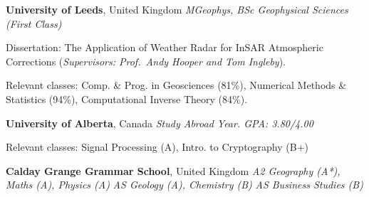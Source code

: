 %
\textbf{University of Leeds}, United Kingdom \newline
\emph{MGeophys, BSc Geophysical Sciences (First Class)} 
\begin{itemize*}
\item Dissertation: The Application of Weather Radar for InSAR Atmospheric
  Corrections (\emph{Supervisors: Prof.~Andy Hooper and Tom Ingleby}).
\item Relevant classes: Comp. \& Prog. in Geosciences (81\%), Numerical Methods
  \& Statistics (94\%), Computational Inverse Theory (84\%).
\end{itemize*}

\medskip
\textbf{University of Alberta}, Canada \newline
\emph{Study Abroad Year. GPA\@: 3.80/4.00} 
\begin{itemize*}
  \item Relevant classes: Signal Processing (A), Intro. to Cryptography (B+)
\end{itemize*}

\medskip
\textbf{Calday Grange Grammar School}, United Kingdom \newline
\emph{A2 Geography (A*), Maths (A), Physics (A)}  \newline
\emph{AS Geology (A), Chemistry (B)} \newline
\emph{AS Business Studies (B)} 

\bigskip

